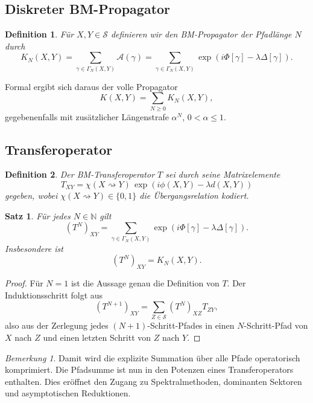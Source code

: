 \documentclass[11pt,a4paper]{article}
\newtheorem{satz}{Satz}
\newtheorem{definition}{Definition}
\theoremstyle{remark}
\newtheorem{bemerkung}{Bemerkung}
\begin{document}
	\subsection{Diskreter BM-Propagator}
	
	\begin{definition}
		Für \(X,Y\in\mathcal S\) definieren wir den BM-Propagator der Pfadlänge \(N\) durch
		\[
		K_N(X,Y)
		=
		\sum_{\gamma\in\Gamma_N(X,Y)}
		\mathcal A(\gamma)
		=
		\sum_{\gamma\in\Gamma_N(X,Y)}
		\exp\!\left(i\Phi[\gamma]-\lambda\Delta[\gamma]\right).
		\]
	\end{definition}
	
	Formal ergibt sich daraus der volle Propagator
	\[
	K(X,Y)
	=
	\sum_{N\ge 0}K_N(X,Y),
	\]
	gegebenenfalls mit zusätzlicher Längenstrafe \(\alpha^N\), \(0<\alpha\le 1\).
	
	\subsection{Transferoperator}
	
	\begin{definition}
		Der \emph{BM-Transferoperator} \(T\) sei durch seine Matrixelemente
		\[
		T_{XY}
		=
		\chi(X\rightsquigarrow Y)\,
		\exp\!\left(i\phi(X,Y)-\lambda d(X,Y)\right)
		\]
		gegeben, wobei \(\chi(X\rightsquigarrow Y)\in\{0,1\}\) die Übergangsrelation kodiert.
	\end{definition}
	
	\begin{satz}
		Für jedes \(N\in\mathbb N\) gilt
		\[
		(T^N)_{XY}
		=
		\sum_{\gamma\in\Gamma_N(X,Y)}
		\exp\!\left(i\Phi[\gamma]-\lambda\Delta[\gamma]\right).
		\]
		Insbesondere ist
		\[
		(T^N)_{XY}=K_N(X,Y).
		\]
	\end{satz}
	
	\begin{proof}
		Für \(N=1\) ist die Aussage genau die Definition von \(T\). 
		Der Induktionsschritt folgt aus
		\[
		(T^{N+1})_{XY}
		=
		\sum_{Z\in\mathcal S}(T^N)_{XZ}T_{ZY},
		\]
		also aus der Zerlegung jedes \((N+1)\)-Schritt-Pfades in einen \(N\)-Schritt-Pfad von \(X\) nach \(Z\) und einen letzten Schritt von \(Z\) nach \(Y\).
	\end{proof}
	
	\begin{bemerkung}
		Damit wird die explizite Summation über alle Pfade operatorisch komprimiert. 
		Die Pfadsumme ist nun in den Potenzen eines Transferoperators enthalten. 
		Dies eröffnet den Zugang zu Spektralmethoden, dominanten Sektoren und asymptotischen Reduktionen.
	\end{bemerkung}
	
\end{document}
